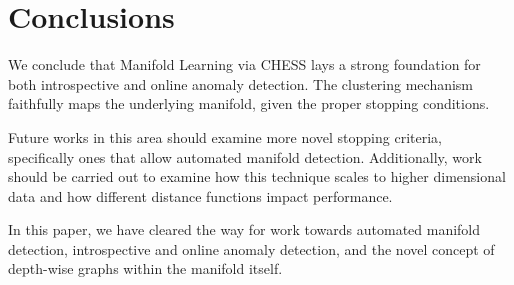\section{Conclusions}
\label{sec:conclusions}

We conclude that Manifold Learning via CHESS lays a strong foundation for both introspective and online anomaly detection.
The clustering mechanism faithfully maps the underlying manifold, given the proper stopping conditions.

Future works in this area should examine more novel stopping criteria, specifically ones that allow automated manifold detection.
Additionally, work should be carried out to examine how this technique scales to higher dimensional data and how different distance functions impact performance.

In this paper, we have cleared the way for work towards automated manifold detection, introspective and online anomaly detection, and the novel concept of depth-wise graphs within the manifold itself.

